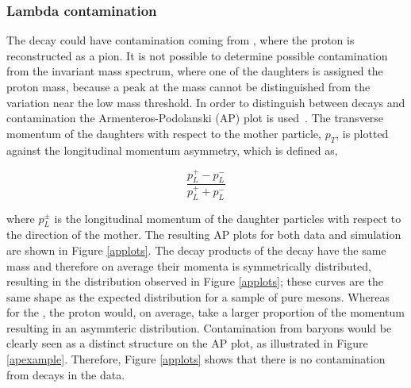 \subsubsection{Lambda contamination}
\label{sec:backgrounds:contamination}

The \decay{\KS}{\pip\pim} decay could have contamination coming from \decay{\Lz}{\proton\pim}, where the proton is reconstructed as a pion. It is not possible to determine possible \Lz contamination from the \KS invariant mass spectrum, where one of the \KS daughters is assigned the proton mass, because a peak at the \Lz mass cannot be distinguished from the variation near the low mass threshold. In order to distinguish between \KS decays and \Lz contamination the Armenteros-Podolanski (AP) plot is used~\cite{APplot}. The transverse momentum of the daughters with respect to the mother particle, $p_T$, is plotted against the longitudinal momentum asymmetry, which is defined as,

\begin{equation}
\frac{p_L^+ - p_L^-}{p_L^+ + p_L^-}
\label{longitudinalpasy}
\end{equation}

where $p_L^{\pm}$ is the longitudinal momentum of the daughter particles with respect to the direction of the mother. The resulting AP plots for both data and simulation are shown in Figure \ref{applots}. The decay products of the \decay{\KS}{\pip\pim} decay have the same mass and therefore on average their momenta is symmetrically distributed, resulting in the distribution observed in Figure \ref{applots}; these curves are the same shape as the expected distribution for a sample of pure \KS mesons. Whereas for the \decay{\Lz}{\proton\pim}, the proton would, on average, take a larger proportion of the momentum resulting in an asymmteric distribution. Contamination from \Lz baryons would be clearly seen as a distinct structure on the AP plot, as illustrated in Figure \ref{apexample}. Therefore, Figure \ref{applots} shows that there is no contamination from \decay{\Lz}{\proton\pim} decays in the data.

